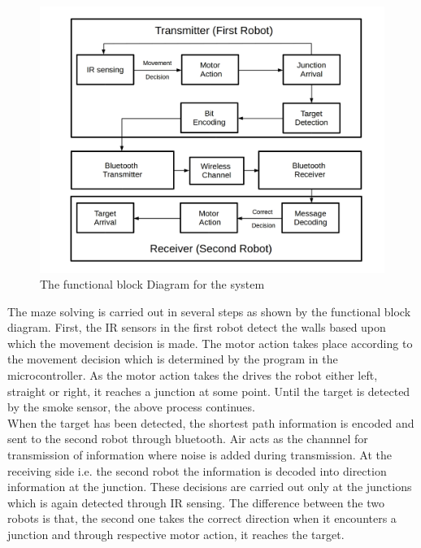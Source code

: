 \begin{figure}[h]
\center
  \includegraphics[scale=0.25]{funtionblock_new.jpg} 
\caption{The functional block Diagram for the system}
\end{figure}
\justify The maze solving is carried out in several steps as shown by the functional block diagram. First, the IR  sensors in the first robot detect the walls based upon which the movement decision is made. The motor action takes place according to the movement decision which is determined by the program in the microcontroller. As the motor action takes the drives the robot either left, straight or right, it reaches a junction at some point. Until the target is detected by the smoke sensor, the above process continues.\\
When the target has been detected, the shortest path information is encoded and sent to the second robot through bluetooth. Air acts as the channnel for transmission of information where noise is added during transmission. At the receiving side i.e. the second robot the information is decoded into direction information at the junction. These decisions are carried out only at the junctions which is again detected through IR sensing. The difference between the two robots is that, the second one takes the correct direction when it encounters a junction and through respective motor action, it reaches the target. 
